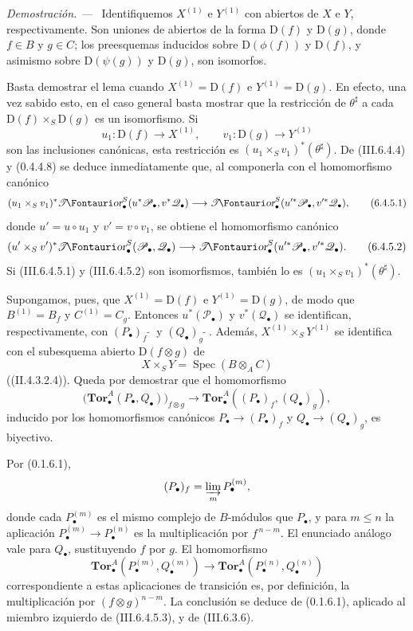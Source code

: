 \documentclass[10pt,oneside]{book}
\makeatletter
\newcommand{\sh}[1]{\mathscr{#1}}
\newcommand*{\ega@sheafop}[3]{\sh{#1}#2\textup{\kern-2.2pt{\Fontauri\slshape #3}}}
\newcommand{\shTor}{\ega@sheafop{T}{}{or}}
\newcommand{\vphi}{\phi}
\newcommand{\supertilde}{{\,\widetilde{\,}\,}}
\newcommand{\Spec}{\operatorname{Spec}}
\newcommand{\sref}[2][]{\textup{(#2)}}
\newcommand{\oldpage}[2][]{\setcounter{footnote}{0}\marginpar{\scriptsize\textbf{#1}~|~#2}\ignorespaces}
\newenvironment{proof}{\par\medskip\noindent\textit{Demostración. ---\ }}{\par}
\makeatother
\begin{document}
\begin{proof}
Identifiquemos $X^{(1)}$ e $Y^{(1)}$ con abiertos de $X$ e $Y$,
respectivamente. Son uniones de abiertos de la forma $\mathrm D(f)$
y $\mathrm D(g)$, donde $f\in B$ y $g\in C$; los preesquemas
inducidos sobre $\mathrm D(\vphi(f))$ y $\mathrm D(f)$, y asimismo
sobre $\mathrm D(\psi(g))$ y $\mathrm D(g)$, son isomorfos.

Basta demostrar el lema cuando $X^{(1)}=\mathrm D(f)$ e
$Y^{(1)}=\mathrm D(g)$. En efecto, una vez sabido esto, en el caso
general basta mostrar que la restricción de $\theta^\sharp$ a cada
$\mathrm D(f)\times_S\mathrm D(g)$ es un isomorfismo. Si
\[
  u_1:\mathrm D(f)\longrightarrow X^{(1)},
  \qquad
  v_1:\mathrm D(g)\longrightarrow Y^{(1)}
\]
son las inclusiones canónicas, esta restricción es
$(u_1\times_Sv_1)^*(\theta^\sharp)$. De
\sref{III.6.4.4} y \sref[0]{0.4.4.8} se deduce inmediatamente que,
al componerla con el homomorfismo canónico
\[
  (u_1\times_Sv_1)^*
  \boldsymbol{\shTor}_\bullet^S(u^*\sh P_\bullet,v^*\sh Q_\bullet)
  \longrightarrow
  \boldsymbol{\shTor}_\bullet^S(u'^*\sh P_\bullet,v'^*\sh Q_\bullet),
  \tag{6.4.5.1}\label{III.6.4.5.1}
\]
donde $u'=u\circ u_1$ y $v'=v\circ v_1$, se obtiene el
homomorfismo canónico
\[
  (u'\times_Sv')^*
  \boldsymbol{\shTor}_\bullet^S(\sh P_\bullet,\sh Q_\bullet)
  \longrightarrow
  \boldsymbol{\shTor}_\bullet^S(u'^*\sh P_\bullet,v'^*\sh Q_\bullet).
  \tag{6.4.5.2}\label{III.6.4.5.2}
\]
Si \sref{III.6.4.5.1} y \sref{III.6.4.5.2} son isomorfismos,
también lo es $(u_1\times_Sv_1)^*(\theta^\sharp)$.

Supongamos, pues, que $X^{(1)}=\mathrm D(f)$ e
$Y^{(1)}=\mathrm D(g)$, de modo que $B^{(1)}=B_f$ y
$C^{(1)}=C_g$. Entonces $u^*(\sh P_\bullet)$ y
$v^*(\sh Q_\bullet)$ se identifican, respectivamente, con
$(P_\bullet)_f\supertilde$ y $(Q_\bullet)_g\supertilde$.
Además, $X^{(1)}\times_SY^{(1)}$ se identifica con el subesquema
abierto $\mathrm D(f\otimes g)$ de
\[
  X\times_SY=\Spec(B\otimes_AC)
\]
(\sref[II]{II.4.3.2.4}). Queda por demostrar que el homomorfismo
\[
  \bigl(\mathbf{Tor}_\bullet^A(P_\bullet,Q_\bullet)\bigr)_{f\otimes g}
  \longrightarrow
  \mathbf{Tor}_\bullet^A((P_\bullet)_f,(Q_\bullet)_g),
  \tag{6.4.5.3}\label{III.6.4.5.3}
\]
\oldpage[III]{148}
inducido por los homomorfismos canónicos
$P_\bullet\longrightarrow(P_\bullet)_f$ y
$Q_\bullet\longrightarrow(Q_\bullet)_g$, es biyectivo.

Por \sref[0]{0.1.6.1},
\[
  (P_\bullet)_f=\varinjlim_m P_\bullet^{(m)},
\]
donde cada $P_\bullet^{(m)}$ es el mismo complejo de $B$-módulos
que $P_\bullet$, y para $m\leq n$ la aplicación
$P_\bullet^{(m)}\longrightarrow P_\bullet^{(n)}$ es la
multiplicación por $f^{\,n-m}$. El enunciado análogo vale para
$Q_\bullet$, sustituyendo $f$ por $g$. El homomorfismo
\[
  \mathbf{Tor}_\bullet^A(P_\bullet^{(m)},Q_\bullet^{(m)})
  \longrightarrow
  \mathbf{Tor}_\bullet^A(P_\bullet^{(n)},Q_\bullet^{(n)})
\]
correspondiente a estas aplicaciones de transición es, por
definición, la multiplicación por $(f\otimes g)^{n-m}$. La
conclusión se deduce de \sref[0]{0.1.6.1}, aplicado al miembro
izquierdo de \sref{III.6.4.5.3}, y de \sref{III.6.3.6}.
\end{proof}
\end{document}
